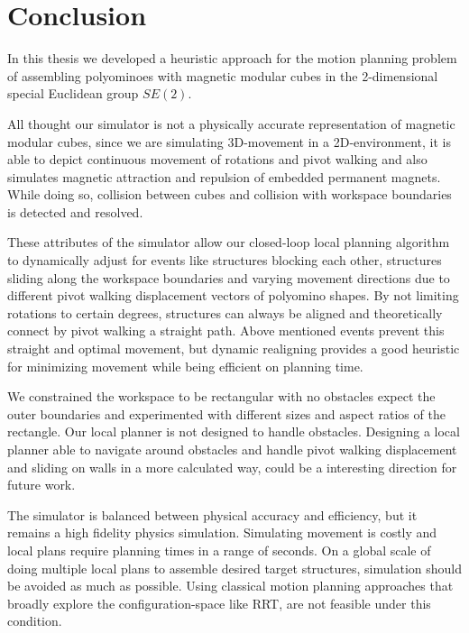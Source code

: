 \chapter{Conclusion}
\label{chap:conclusion}

In this thesis we developed a heuristic approach for the motion planning problem of assembling polyominoes with magnetic modular cubes \cite{Bhattacharjee2022} in the 2-dimensional special Euclidean group $\textit{SE}(2)$.

All thought our simulator is not a physically accurate representation of magnetic modular cubes, since we are simulating 3D-movement in a 2D-environment, it is able to depict continuous movement of rotations and pivot walking and also simulates magnetic attraction and repulsion of embedded permanent magnets.
While doing so, collision between cubes and collision with workspace boundaries is detected and resolved.

These attributes of the simulator allow our closed-loop local planning algorithm to dynamically adjust for events like structures blocking each other, structures sliding along the workspace boundaries and varying movement directions due to different pivot walking displacement vectors of polyomino shapes.
By not limiting rotations to certain degrees, structures can always be aligned and theoretically connect by pivot walking a straight path.
Above mentioned events prevent this straight and optimal movement, but dynamic realigning provides a good heuristic for minimizing movement while being efficient on planning time.

We constrained the workspace to be rectangular with no obstacles expect the outer boundaries and experimented with different sizes and aspect ratios of the rectangle.
Our local planner is not designed to handle obstacles.
Designing a local planner able to navigate around obstacles and handle pivot walking displacement and sliding on walls in a more calculated way, could be a interesting direction for future work.

The simulator is balanced between physical accuracy and efficiency, but it remains a high fidelity physics simulation.
Simulating movement is costly and local plans require planning times in a range of seconds.
On a global scale of doing multiple local plans to assemble desired target structures, simulation should be avoided as much as possible.
Using classical motion planning approaches that broadly explore the configuration-space like RRT, are not feasible under this condition.

